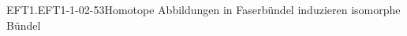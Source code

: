 \begin{KORO}{EFT1.EFT1-1-02-53}{Homotope Abbildungen in Faserbündel induzieren isomorphe Bündel}

\end{KORO}
